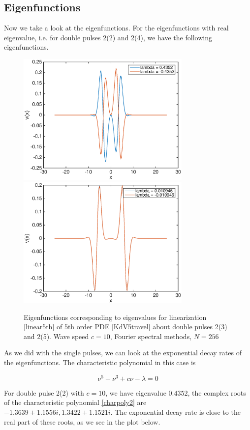 \documentclass[12pt]{article}
\begin{document}
\subsection{Eigenfunctions}

Now we take a look at the eigenfunctions. For the eigenfunctions with real eigenvalue, i.e. for double pulses 2(2) and 2(4), we have the following eigenfunctions.

\begin{figure}[H]
	\includegraphics[width=8.5cm]{four10dp1eigenfns}
	\includegraphics[width=8.5cm]{four10dp3eigenfns}
	\caption{Eigenfunctions corresponding to eigenvalues for linearization \eqref{linear5th} of 5th order PDE \eqref{KdV5travel} about double pulses 2(3) and 2(5). Wave speed $c = 10$, Fourier spectral methods, $N = 256$}
\end{figure}

As we did with the single pulses, we can look at the exponential decay rates of the eigenfunctions. The characteristic polynomial in this case is 

\begin{equation} \label{charpoly2}
\nu^5 - \nu^3 + c \nu - \lambda = 0
\end{equation}

For double pulse 2(2) with $c = 10$, we have eigenvalue $0.4352$, the complex roots of the characteristic polynomial \eqref{charpoly2} are $-1.3639 \pm 1.1556i, 1.3422 \pm 1.1521i$. The exponential decay rate is close to the real part of these roots, as we see in the plot below.
\end{document}
